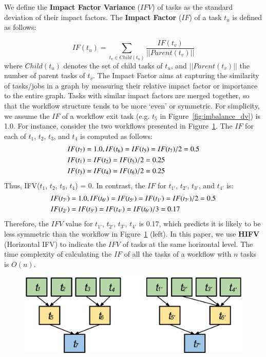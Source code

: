 \documentclass[final,5p,times,twocolumn]{elsarticle}
\begin{document}
We define the \textbf{Impact Factor Variance} ($IFV$) of tasks as the standard deviation of their impact factors. The \textbf{Impact Factor} ($IF$) of a task $t_u$ is defined as follows:

\begin{equation}
\label{eq:imbalance_impact_factor}
	IF(t_u)=\sum_{t_v\in Child(t_u)}^{}\frac{IF(t_v)}{||Parent(t_v)||}
\end{equation}
where $Child(t_u)$ denotes the set of child tasks of $t_u$, and $||Parent(t_v)||$ the number of parent tasks of $t_v$. The Impact Factor aims at capturing the similarity of tasks/jobs in a graph by measuring their relative impact factor or importance to the entire graph. Tasks with similar impact factors are merged together, so that the workflow structure tends to be more `even' or symmetric. For simplicity, we assume the $IF$ of a workflow exit task (e.g. $t_5$ in Figure~\ref{fig:imbalance_dv}) is 1.0. For instance, consider the two workflows presented in Figure~\ref{fig:imbalance_hifv}. The $IF$ for each of $t_1$, $t_2$, $t_3$, and $t_4$ is computed as follows:
\begin{eqnarray}
	\displaystyle  
	&IF(t_7 )=1.0, IF(t_6 )=IF(t_5 )=IF(t_7 )/2=0.5\nonumber  \\
	&IF(t_1 )=IF(t_2 )=IF(t_5 )/2=0.25\nonumber \\
	&IF(t_3 )=IF(t_4 )=IF(t_6 )/2=0.25\nonumber 
\end{eqnarray}
Thus, IFV($t_1$, $t_2$, $t_3$, $t_4$) = 0. In contrast, the $IF$ for $t_{1'}$, $t_{2'}$, $t_{3'}$, and $t_{4'}$ is:
\begin{eqnarray}
	\displaystyle  
	&IF(t_{7'})=1.0, IF(t_{6'})=IF(t_{5'})=IF(t_{1'})=IF(t_{7'})/2=0.5\nonumber \\
	&IF(t_{2'})=IF(t_{3'})=IF(t_{4'})=IF(t_{6'})/3=0.17 \nonumber
\end{eqnarray}
Therefore, the $IFV$ value for {$t_{1'}$, $t_{2'}$, $t_{3'}$, $t_{4'}$} is 0.17, which predicts it is likely to be less symmetric than the workflow in Figure~\ref{fig:imbalance_hifv} (left). In this paper, we use \textbf{HIFV} (Horizontal IFV) to indicate the $IFV$ of tasks at the same horizontal level. The time complexity of calculating the $IF$ of all the tasks of a workflow with $n$ tasks is $O(n)$.  

\begin{figure}[htb]
	\centering
	\includegraphics[width=0.85\linewidth]{figure7.eps}
	\label{fig:imbalance_hifv}
\end{figure}
\end{document}
